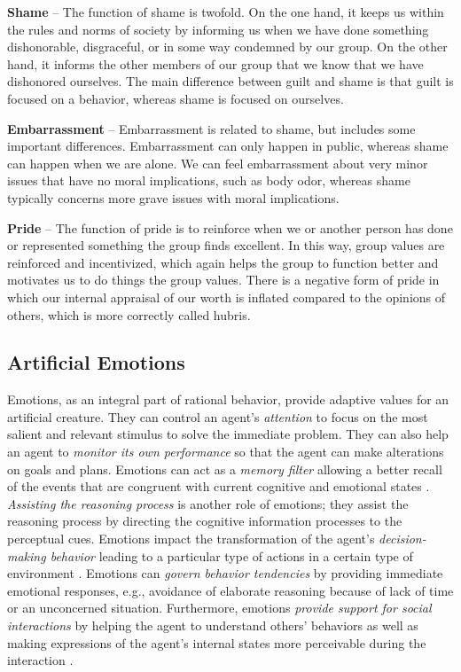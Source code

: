 \documentclass[12pt]{report}
\begin{document}
\noindent \textbf{Shame} -- The function of shame is twofold. On the one hand,
it keeps us within the rules and norms of society by informing us when we have
done something dishonorable, disgraceful, or in some way condemned by our group.
On the other hand, it informs the other members of our group that we know that
we have dishonored ourselves. The main difference between guilt and shame is
that guilt is focused on a behavior, whereas shame is focused on ourselves.

\noindent \textbf{Embarrassment} -- Embarrassment is related to shame, but
includes some important differences. Embarrassment can only happen in public,
whereas shame can happen when we are alone. We can feel embarrassment about very
minor issues that have no moral implications, such as body odor, whereas shame
typically concerns more grave issues with moral implications.

\noindent \textbf{Pride} -- The function of pride is to reinforce when we or
another person has done or represented something the group finds excellent. In
this way, group values are reinforced and incentivized, which again helps the
group to function better and motivates us to do things the group values. There
is a negative form of pride in which our internal appraisal of our worth is
inflated compared to the opinions of others, which is more correctly called
hubris.

\subsection{Artificial Emotions}
\label{sec:artificial-emotions}
Emotions, as an integral part of rational behavior, provide adaptive values for
an artificial creature. They can control an agent's \textit{attention} to focus
on the most salient and relevant stimulus to solve the immediate problem. They
can also help an agent to \textit{monitor its own performance} so that the agent
can make alterations on goals and plans. Emotions can act as a \textit{memory
filter} allowing a better recall of the events that are congruent with current
cognitive and emotional states \cite{brave:emotion-hci}. \textit{Assisting the
reasoning process} is another role of emotions; they assist the reasoning
process by directing the cognitive information processes to the perceptual cues.
Emotions impact the transformation of the agent's \textit{decision-making
behavior} \cite{gmytrasiewicz:emotion-agent-decision} leading to a particular
type of actions in a certain type of environment \cite{zhu:emotion-action}.
Emotions can \textit{govern behavior tendencies} by providing immediate
emotional responses, e.g., avoidance of elaborate reasoning because of lack of
time or an unconcerned situation. Furthermore, emotions \textit{provide support
for social interactions} by helping the agent to understand others' behaviors as
well as making expressions of the agent's internal states more perceivable
during the interaction \cite{gadanho:learning-emotions}.
\end{document}
